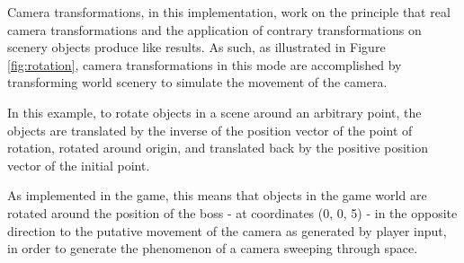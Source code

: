 \documentclass[11pt]{article}
\begin{document}
Camera transformations, in this implementation, work on the principle that real camera
transformations and the application of contrary transformations on scenery objects
produce like results. As such, as illustrated in Figure \ref{fig:rotation}, camera transformations
in this mode are accomplished by transforming world scenery to simulate the movement of the camera.

In this example, to rotate objects in a scene around an arbitrary point, the objects are
translated by the inverse of the position vector of the point of rotation, rotated around
origin, and translated back by the positive position vector of the initial point.

As implemented in the game, this means that objects in the game world are rotated around
the position of the boss - at coordinates (0, 0, 5) - in the opposite direction to the
putative movement of the camera as generated by player input, in order to generate the
phenomenon of a camera sweeping through space.
\end{document}
